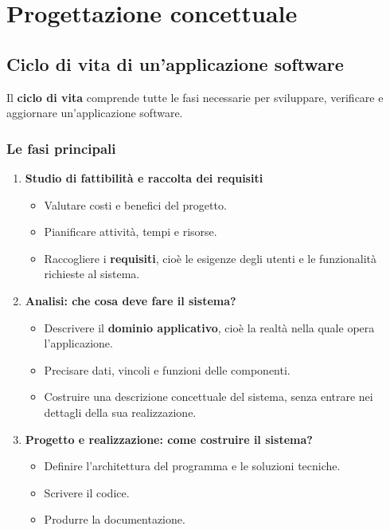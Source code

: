 \chapter{Progettazione concettuale}
\section{Ciclo di vita di un'applicazione software}

Il \textbf{ciclo di vita} comprende tutte le fasi necessarie per
sviluppare, verificare e aggiornare un'applicazione software.

\subsection{Le fasi principali}

\begin{enumerate}
    \item \textbf{Studio di fattibilità e raccolta dei requisiti}
    \begin{itemize}
        \item Valutare costi e benefici del progetto.
        \item Pianificare attività, tempi e risorse.
        \item Raccogliere i \textbf{requisiti}, cioè le esigenze
        degli utenti e le funzionalità richieste al sistema.
    \end{itemize}

    \item \textbf{Analisi: che cosa deve fare il sistema?}
    \begin{itemize}
        \item Descrivere il \textbf{dominio applicativo},
        cioè la realtà nella quale opera l'applicazione.
        \item Precisare dati, vincoli e funzioni delle componenti.
        \item Costruire una descrizione concettuale del sistema,
        senza entrare nei dettagli della sua realizzazione.
    \end{itemize}

    \item \textbf{Progetto e realizzazione: come costruire il sistema?}
    \begin{itemize}
        \item Definire l'architettura del programma e le soluzioni
        tecniche.
        \item Scrivere il codice.
        \item Produrre la documentazione.
    \end{itemize}


\end{enumerate}
